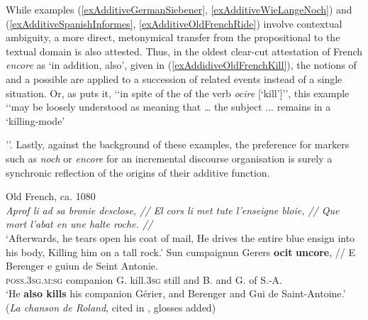 While examples (\ref{exAdditiveGermanSiebener}, \ref{exAdditiveWieLangeNoch}) and (\ref{exAdditiveSpanishInformes}, \ref{exAdditiveOldFrenchRide}) involve contextual ambiguity, a more direct, metonymical transfer from the propositional to the textual domain is also attested. Thus, in the oldest clear-cut attestation of French \textit{encore} as \lq in addition, also\rq{}, given in (\ref{exAddidiveOldFrenchKill}), the notions of  and a possible  are applied to a succession of related events instead of a single situation. Or, as \textcite[158]{MosegaardHansen2008} puts it, \lq\lq in spite of the  of the verb \textit{ocire} [\lq kill\rq{}]\rq\rq, this example \lq\lq may be loosely understood as meaning that … the subject ... remains in a \lq{}killing-mode\rq{}{\rq\rq{}. Lastly, against the background of these examples, the preference for markers such as \textit{noch} or \textit{encore} for an incremental discourse organisation is surely a synchronic reflection of the origins of their additive function.

\begin{exe}
	\ex Old French, ca. 1080\label{exAddidiveOldFrenchKill}\\
\textit{Aprof li ad sa bronie desclose, // El cors li met tute l’enseigne bloie, // Que mort l’abat en une halte roche. //} \\
	\lq Afterwards, he tears open his coat of mail, He drives the entire blue ensign into his body, Killing him on a tall rock.'
	\exi{}\gll Sun cumpaignun Gerers \textbf{ocit} \textbf{uncore}, // E Berenger e guiun de Seint Antonie.\\
	\textsc{poss}.3\textsc{sg}.\textsc{m}:\textsc{sg} companion G. kill.3\textsc{sg} still {} and B. and G. of S.-A.\\
	\glt \lq He \textbf{also kills} his companion Gérier, and Berenger and Gui de Saint-Antoine.' (\textit{La chanson de Roland}, cited in \cite[158]{MosegaardHansen2008}, glosses added)
\end{exe}

}
